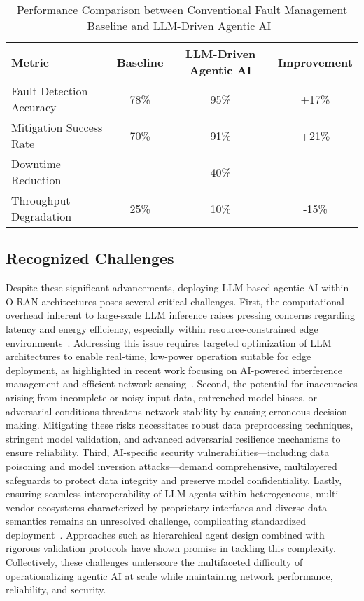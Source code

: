 \documentclass[sigconf]{acmart}
\begin{document}
\begin{table*}[htbp]
\centering
\caption{Performance Comparison between Conventional Fault Management Baseline and LLM-Driven Agentic AI~\cite{ref55}}
\label{tab:performance_comparison}
\begin{adjustbox}{max width=\textwidth}
\begin{tabular}{@{}lccc@{}}
\toprule
Metric & Baseline & LLM-Driven Agentic AI & Improvement \\ \midrule
Fault Detection Accuracy & 78\% & 95\% & +17\% \\
Mitigation Success Rate & 70\% & 91\% & +21\% \\
Downtime Reduction & - & 40\% & - \\
Throughput Degradation & 25\% & 10\% & -15\% \\ \bottomrule
\end{tabular}
\end{adjustbox}
\end{table*}

\subsection{Recognized Challenges}

Despite these significant advancements, deploying LLM-based agentic AI within O-RAN architectures poses several critical challenges. First, the computational overhead inherent to large-scale LLM inference raises pressing concerns regarding latency and energy efficiency, especially within resource-constrained edge environments~\cite{ref55,ref48}. Addressing this issue requires targeted optimization of LLM architectures to enable real-time, low-power operation suitable for edge deployment, as highlighted in recent work focusing on AI-powered interference management and efficient network sensing~\cite{ref48,ref55}. Second, the potential for inaccuracies arising from incomplete or noisy input data, entrenched model biases, or adversarial conditions threatens network stability by causing erroneous decision-making. Mitigating these risks necessitates robust data preprocessing techniques, stringent model validation, and advanced adversarial resilience mechanisms to ensure reliability. Third, AI-specific security vulnerabilities—including data poisoning and model inversion attacks—demand comprehensive, multilayered safeguards to protect data integrity and preserve model confidentiality. Lastly, ensuring seamless interoperability of LLM agents within heterogeneous, multi-vendor ecosystems characterized by proprietary interfaces and diverse data semantics remains an unresolved challenge, complicating standardized deployment~\cite{ref55,ref48}. Approaches such as hierarchical agent design combined with rigorous validation protocols have shown promise in tackling this complexity. Collectively, these challenges underscore the multifaceted difficulty of operationalizing agentic AI at scale while maintaining network performance, reliability, and security.
\end{document}
